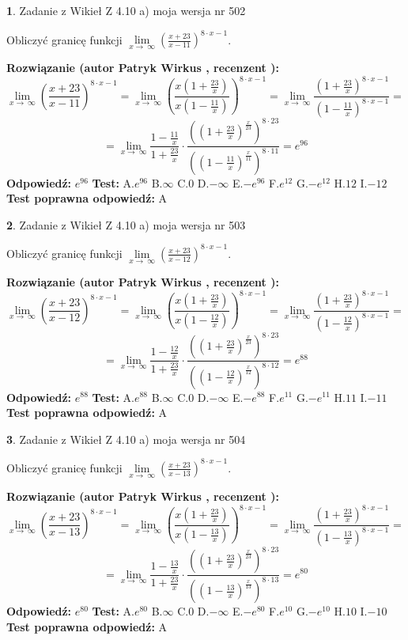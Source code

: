 \documentclass[12pt, a4paper]{article}
\theoremstyle{definition} %
\newtheorem{zad}{}
\newcommand{\zadStart}[1]{\begin{zad}#1\newline}
\newcommand{\zadStop}{\end{zad}}
\newcommand{\rozwStart}[2]{\noindent \textbf{Rozwiązanie (autor #1 , recenzent #2): }\newline}
\newcommand{\rozwStop}{\newline}
\newcommand{\odpStart}{\noindent \textbf{Odpowiedź:}\newline}
\newcommand{\odpStop}{\newline}
\newcommand{\testStart}{\noindent \textbf{Test:}\newline}
\newcommand{\testStop}{\newline}
\newcommand{\kluczStart}{\noindent \textbf{Test poprawna odpowiedź:}\newline}
\newcommand{\kluczStop}{\newline}
\begin{document}
\zadStart{Zadanie z Wikieł Z 4.10 a) moja wersja nr 502}

Obliczyć granicę funkcji  $\lim\limits_{x\to\ \infty}(\frac{x+23}{x-11})^{8\cdot x-1}$.
\zadStop
\rozwStart{Patryk Wirkus}{}
$$\lim\limits_{x\to\ \infty}(\frac{x+23}{x-11})^{8\cdot x-1} = \lim\limits_{x\to\ \infty}(\frac{x(1+\frac{23}{x})}{x(1-\frac{11}{x})})^{8\cdot x-1}=\lim\limits_{x\to\ \infty}\frac{(1+\frac{23}{x})^{8\cdot x-1}}{(1-\frac{11}{x})^{8\cdot x-1}}=$$
$$=\lim\limits_{x\to\ \infty}\frac{1-\frac{11}{x}}{1+\frac{23}{x}}\cdot\frac{((1+\frac{23}{x})^{\frac{x}{23}})^{8\cdot23}}{((1-\frac{11}{x})^{\frac{x}{11}})^{8\cdot11}}=e^{96}$$
\rozwStop
\odpStart
$e^{96}$
\odpStop
\testStart
A.$e^{96}$ B.$\infty$ C.$0$ D.$-\infty$ E.$-e^{96}$
F.$e^{12}$ G.$-e^{12}$
H.$12$
I.$-12$
\testStop
\kluczStart
A
\kluczStop



\zadStart{Zadanie z Wikieł Z 4.10 a) moja wersja nr 503}

Obliczyć granicę funkcji  $\lim\limits_{x\to\ \infty}(\frac{x+23}{x-12})^{8\cdot x-1}$.
\zadStop
\rozwStart{Patryk Wirkus}{}
$$\lim\limits_{x\to\ \infty}(\frac{x+23}{x-12})^{8\cdot x-1} = \lim\limits_{x\to\ \infty}(\frac{x(1+\frac{23}{x})}{x(1-\frac{12}{x})})^{8\cdot x-1}=\lim\limits_{x\to\ \infty}\frac{(1+\frac{23}{x})^{8\cdot x-1}}{(1-\frac{12}{x})^{8\cdot x-1}}=$$
$$=\lim\limits_{x\to\ \infty}\frac{1-\frac{12}{x}}{1+\frac{23}{x}}\cdot\frac{((1+\frac{23}{x})^{\frac{x}{23}})^{8\cdot23}}{((1-\frac{12}{x})^{\frac{x}{12}})^{8\cdot12}}=e^{88}$$
\rozwStop
\odpStart
$e^{88}$
\odpStop
\testStart
A.$e^{88}$ B.$\infty$ C.$0$ D.$-\infty$ E.$-e^{88}$
F.$e^{11}$ G.$-e^{11}$
H.$11$
I.$-11$
\testStop
\kluczStart
A
\kluczStop



\zadStart{Zadanie z Wikieł Z 4.10 a) moja wersja nr 504}

Obliczyć granicę funkcji  $\lim\limits_{x\to\ \infty}(\frac{x+23}{x-13})^{8\cdot x-1}$.
\zadStop
\rozwStart{Patryk Wirkus}{}
$$\lim\limits_{x\to\ \infty}(\frac{x+23}{x-13})^{8\cdot x-1} = \lim\limits_{x\to\ \infty}(\frac{x(1+\frac{23}{x})}{x(1-\frac{13}{x})})^{8\cdot x-1}=\lim\limits_{x\to\ \infty}\frac{(1+\frac{23}{x})^{8\cdot x-1}}{(1-\frac{13}{x})^{8\cdot x-1}}=$$
$$=\lim\limits_{x\to\ \infty}\frac{1-\frac{13}{x}}{1+\frac{23}{x}}\cdot\frac{((1+\frac{23}{x})^{\frac{x}{23}})^{8\cdot23}}{((1-\frac{13}{x})^{\frac{x}{13}})^{8\cdot13}}=e^{80}$$
\rozwStop
\odpStart
$e^{80}$
\odpStop
\testStart
A.$e^{80}$ B.$\infty$ C.$0$ D.$-\infty$ E.$-e^{80}$
F.$e^{10}$ G.$-e^{10}$
H.$10$
I.$-10$
\testStop
\kluczStart
A
\kluczStop
\end{document}
